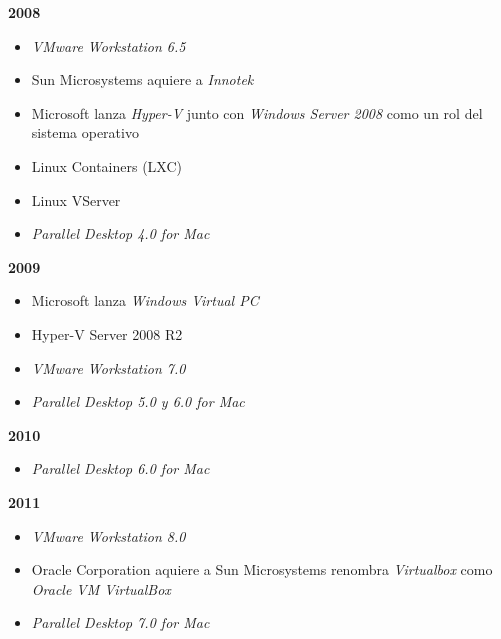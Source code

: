 \textbf{2008}\\
\begin{itemize}
	\item \textit{VMware Workstation 6.5}\\
	
	\item Sun Microsystems aquiere a \textit{Innotek}\\
	
	\item Microsoft lanza \textit{Hyper-V} junto con \textit{Windows Server 2008} como un rol del sistema operativo\\
	
	\item Linux Containers (LXC)\\
	
	\item Linux VServer\\
	
	\item \textit{Parallel Desktop 4.0 for Mac}\\
\end{itemize}
			
\textbf{2009}\\
\begin{itemize}
	\item Microsoft lanza \textit{Windows Virtual PC} \\
	
	\item Hyper-V Server 2008 R2\\
	
	\item \textit{VMware Workstation 7.0}\\
	
	\item \textit{Parallel Desktop 5.0 y 6.0 for Mac}\\
\end{itemize}

\textbf{2010}\\
\begin{itemize}
	\item \textit{Parallel Desktop 6.0 for Mac}\\	
\end{itemize}

\textbf{2011}\\
\begin{itemize}
	\item \textit{VMware Workstation 8.0}\\
	
	\item Oracle Corporation aquiere a Sun Microsystems renombra \textit{Virtualbox} como \textit{Oracle VM VirtualBox}\\
	
	\item \textit{Parallel Desktop 7.0 for Mac}\\	
\end{itemize}

